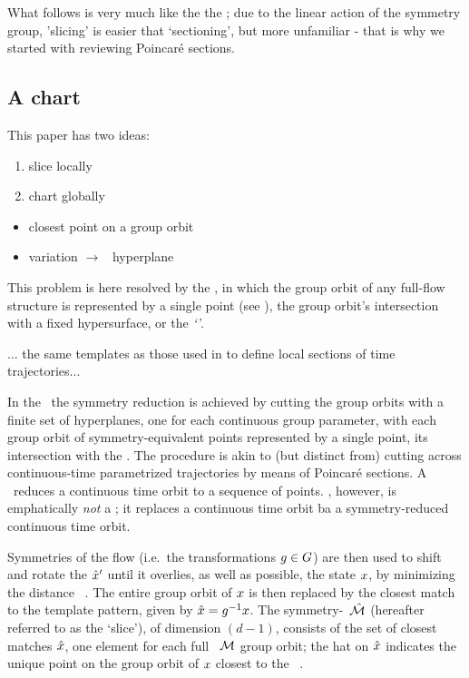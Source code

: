 What follows is very much like the the ; due to the linear
action of the symmetry group, 'slicing' is easier that `sectioning', but
more unfamiliar - that is why we started with reviewing Poincar\'e
sections.

\subsection{A chart}

This paper has two ideas:
\begin{enumerate}
  \item slice locally
  \item chart globally
\end{enumerate}

    \begin{itemize}
      \item closest point on a group orbit
      \item variation $\to$ \slice\ hyperplane
    \end{itemize}

This problem is here resolved by the
{\mslices}, in which
the group orbit of any full-flow structure is represented by a single
point (see ), the group orbit's intersection with a
fixed hypersurface, or the \emph{`\slice'}.


... the same templates as those used in  to define local
sections of time trajectories...

In the \mslices\ the symmetry reduction is achieved by cutting the group
orbits with a finite set of hyperplanes, one for each continuous group
parameter, with each group orbit of symmetry-equivalent points
represented by a single point, its intersection with the \slice. The
procedure is akin to (but distinct from) cutting across continuous-time
parametrized trajectories by means of Poincar\'e sections. A \PoincSec\
reduces a continuous time orbit to a sequence of points. \Slice, however,
is emphatically \emph{not} a \PoincSec; it replaces a continuous time
orbit ba a symmetry-reduced continuous time orbit.

Symmetries of the flow (i.e.\ the transformations $g\in G$) are
then used to shift and rotate the {\template} ${\hat{x}'}$ until it
overlies, as well as possible, the state $x$, by minimizing the
distance
\beq
\Norm{\ssp - \LieEl(\gSpace)\,\slicep}
\, .
The entire group orbit of $x$ is then replaced by the closest match to
the template pattern, given by $\hat{x}=g^{-1}x$. The
symmetry-\reducedsp\ $\hat{\cal M}$ (hereafter referred to as the `slice'), of
dimension $(d\!-\!1)$, consists of the set of closest matches $\hat{x}$,
one element for each full \statesp\ ${\cal M}$ group orbit; the hat on
$\hat{x}$ indicates the unique point on the group orbit of $x$ closest
to the \template\ \slicep.

